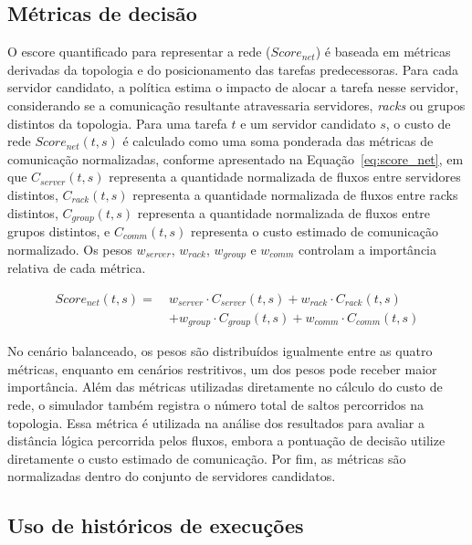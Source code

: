 \documentclass[12pt]{article}
\begin{document}
\subsection{Métricas de decisão}
\label{subsec:metricas_decisao}

O escore quantificado para representar a rede ($Score_{net}$) é baseada em métricas derivadas da topologia e do posicionamento das tarefas predecessoras. 
%
Para cada servidor candidato, a política estima o impacto de alocar a tarefa nesse servidor, considerando se a comunicação resultante atravessaria servidores, \textit{racks} ou grupos distintos da topologia.
%
Para uma tarefa $t$ e um servidor candidato $s$, o custo de rede $Score_{net}(t,s)$ é calculado como uma soma ponderada das métricas de comunicação normalizadas, conforme apresentado na Equação~\ref{eq:score_net}, em que $C_{server}(t,s)$ representa a quantidade normalizada de fluxos entre servidores distintos, $C_{rack}(t,s)$ representa a quantidade normalizada de fluxos entre racks distintos, $C_{group}(t,s)$ representa a quantidade normalizada de fluxos entre grupos distintos, e $C_{comm}(t,s)$ representa o custo estimado de comunicação normalizado. Os pesos $w_{server}$, $w_{rack}$, $w_{group}$ e $w_{comm}$ controlam a importância relativa de cada métrica.


\begin{equation}
\begin{split}
Score_{net}(t,s) =\ & w_{server} \cdot C_{server}(t,s) + w_{rack} \cdot C_{rack}(t,s) \\
& + w_{group} \cdot C_{group}(t,s) + w_{comm} \cdot C_{comm}(t,s)
\end{split}
\label{eq:score_net}
\end{equation}


No cenário balanceado, os pesos são distribuídos igualmente entre as quatro métricas, enquanto em cenários restritivos, um dos pesos pode receber maior importância. 
%
Além das métricas utilizadas diretamente no cálculo do custo de rede, o simulador também registra o número total de saltos percorridos na topologia. Essa métrica é utilizada na análise dos resultados para avaliar a distância lógica percorrida pelos fluxos, embora a pontuação de decisão utilize diretamente o custo estimado de comunicação.
%
Por fim, as métricas são normalizadas dentro do conjunto de servidores candidatos. 

\subsection{Uso de históricos de execuções}
\label{subsec:uso_historico}
\end{document}
